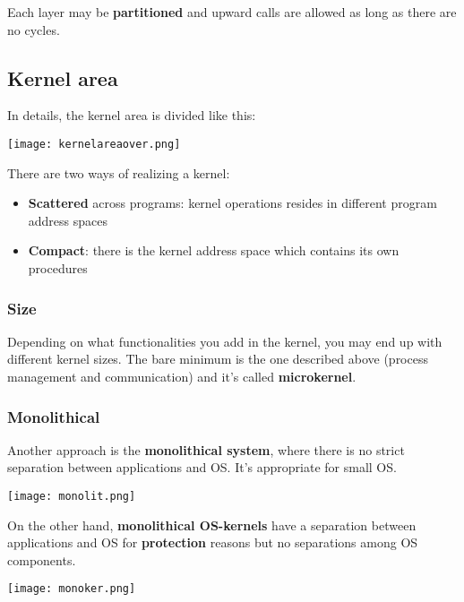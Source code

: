 \begin{note}
	Each layer may be \textbf{partitioned} and upward calls are allowed as long as there are no cycles.
\end{note}

\subsection{Kernel area}
In details, the kernel area is divided like this:
\begin{center}
	\texttt{[image: kernelareaover.png]}
\end{center}
There are two ways of realizing a kernel:
\begin{itemize}
	\item \textbf{Scattered} across programs: kernel operations resides in different program address spaces
	\item \textbf{Compact}: there is the kernel address space which contains its own procedures
\end{itemize}

\subsubsection{Size}
Depending on what functionalities you add in the kernel, you may end up with different kernel sizes. The bare minimum is the one described above (process management and communication) and it's called \textbf{microkernel}.

\subsubsection{Monolithical}
Another approach is the \textbf{monolithical system}, where there is no strict separation between applications and OS. It's appropriate for small OS.
\begin{center}
	\texttt{[image: monolit.png]}
\end{center}
On the other hand, \textbf{monolithical OS-kernels} have a separation between applications and OS for \textbf{protection} reasons but no separations among OS components.
\begin{center}
	\texttt{[image: monoker.png]}
\end{center}

